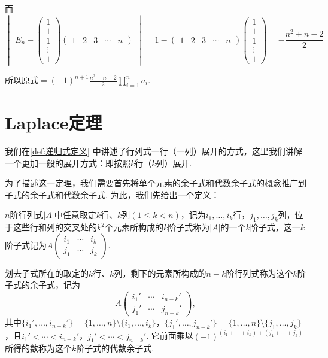 \begin{solution}
    而 \[ \begin{vmatrix}E_n-\begin{pmatrix}
                1 \\1\\1\\\vdots\\1
            \end{pmatrix}\begin{pmatrix}1 & 2 & 3 & \cdots & n\end{pmatrix}\end{vmatrix}
        =1-\begin{pmatrix}1 & 2 & 3 & \cdots & n\end{pmatrix}
        \begin{pmatrix}1 \\ 1 \\ 1 \\ \vdots \\ 1\end{pmatrix}
        =-\frac{n^2+n-2}{2} \]

    所以原式$\displaystyle =(-1)^{n+1}\frac{n^2+n-2}{2}\prod_{i=1}^na_i$.
\end{solution}

\section{Laplace定理}
我们在\autoref{def:递归式定义} 中讲述了行列式一行（一列）展开的方式，这里我们讲解一个更加一般的展开方式：即按照$k$行（$k$列）展开.

为了描述这一定理，我们需要首先将单个元素的余子式和代数余子式的概念推广到子式的余子式和代数余子式. 为此，我们先给出一个定义：
\begin{definition}{}{}
    $n$阶行列式$|A|$中任意取定$k$行、$k$列$(1\leqslant k<n)$，记为$i_1,\ldots,i_k$行，$j_1,\ldots,j_k$列，位于这些行和列的交叉处的$k^2$个元素所构成的$k$阶子式称为$|A|$的一个$k$阶子式，这一$k$阶子式记为$A\begin{pmatrix}
            i_1 & \cdots & i_k \\
            j_1 & \cdots & j_k
        \end{pmatrix}$.

    划去子式所在的取定的$k$行、$k$列，剩下的元素所构成的$n-k$阶行列式称为这个$k$阶子式的余子式，记为
    \[A\begin{pmatrix}
            i_1' & \cdots & i_{n-k}' \\
            j_1' & \cdots & j_{n-k}'
        \end{pmatrix},\]
    其中$\{i_1',\ldots,i_{n-k}'\}=\{1,\ldots,n\}\setminus\{i_1,\ldots,i_k\}$，$\{j_1',\ldots,j_{n-k}'\}=\{1,\ldots,n\}\setminus\{j_1,\ldots,j_k\}$，且$i_1'<\cdots<i_{n-k}'$，$j_1'<\cdots<j_{n-k}'$. 它前面乘以$(-1)^{(i_1+\cdots+i_k)+(j_1+\cdots+j_k)}$所得的数称为这个$k$阶子式的代数余子式.
\end{definition}

